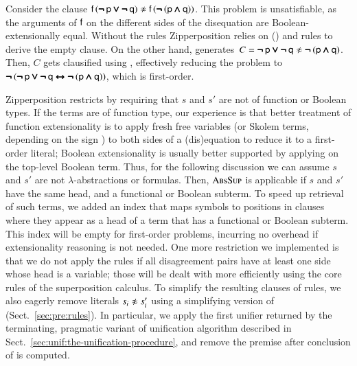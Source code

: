 Consider the clause $\cst{f} \, (\inot\cst{p} \ior \inot\cst{q}) \noteq \cst{f} \,
(\inot (\cst{p} \iand \cst{q}))$. This problem is unsatisfiable, as
the arguments of $\mathsf{f}$ on the different sides of the disequation are Boolean-extensionally
equal. Without the  rules Zipperposition relies on
() and  rules to derive the empty
clause. On the other hand,  generates~$C = \inot\cst{p} \ior \inot\cst{q} \noteq
\inot (\cst{p} \iand \cst{q})$. Then, $C$ gets clausified using
, effectively reducing the problem to $\pmb{\neg\,} (\pmb{\neg\,}\mathsf{p} \pmb{\lor}
\pmb{\neg\,}\mathsf{q} \pmb{\leftrightarrow} \pmb{\neg\,} (\mathsf{p} \pmb{\land} \mathsf{q}))$, which is first-order.

\begin{sloppypar}
  Zipperposition restricts  by
  requiring that $s$ and $s'$ are not of function or Boolean types. If the terms are of function type, our experience is
  that better treatment of function extensionality is to apply fresh free
  variables (or Skolem terms, depending on the sign
  \cite{bbtvw-21-sup-lam}) to both sides of a (dis)equation to reduce it to
  a first-order literal; Boolean extensionality is usually better supported by
  applying  on the top-level Boolean term. Thus, for the following
  discussion we can assume $s$ and $s'$ are not $\lambda$-abstractions or formulas. Then, $\textsc{AbsSup}$ is applicable if $s$
  and $s'$ have the same head, and a functional or Boolean subterm. To speed up
  retrieval of such terms, we added an index that maps symbols to positions in
  clauses where they appear as a head of a term that has a functional or Boolean
  subterm. This index will be empty for first-order problems, incurring no
  overhead if extensionality reasoning is not needed. One more restriction we implemented is that we do not apply the  rules if all
  disagreement pairs have at least one side whose head is a variable; those will
  be dealt with more efficiently using the core rules of the superposition
  calculus. To simplify the resulting clauses of  rules, we also
  eagerly remove literals $s_i \not\approx s'_i$ using a simplifying version of
   (Sect.~\ref{sec:pre:rules}). In particular, we apply the first
  unifier returned by the terminating, pragmatic variant of unification
  algorithm described in Sect.~\ref{sec:unif:the-unification-procedure}, and
  remove the premise after conclusion of  is computed.
\end{sloppypar}

